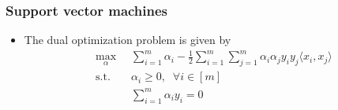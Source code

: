 \documentclass[10pt]{beamer}
\begin{document}
\begin{frame}
  \frametitle{Support vector machines}
  \begin{itemize}
  \item The dual optimization problem is given by
  \begin{align*}
	\max_\alpha \;\; & \sum_{i=1}^m \alpha_i - \frac 1 2 \sum_{i=1}^m \sum_{j=1}^m \alpha_i \alpha_j y_i y_j \langle x_i, x_j \rangle\\
	\mathrm{s.t.} \;\; & \alpha_i \geq 0, \;\; \forall i\in[m]\\
	& \sum_{i=1}^m \alpha_i y_i = 0
  \end{align*}
  \end{itemize}
\end{frame}
\end{document}

